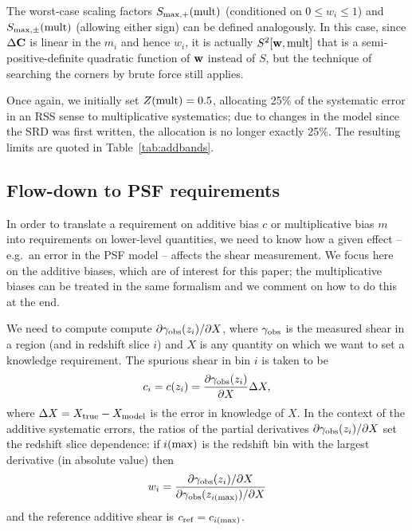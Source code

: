 \documentclass[aps,prd, amsmath,amssymb,superscriptaddress,showkeys,nofootinbib,reprint,preprintnumbers]{revtex4-1}
\begin{document}
\begin{widetext}
The worst-case scaling factors $S_{\rm max,+}({\rm mult})$ (conditioned on $0\le w_i\le 1$) and $S_{\rm max,\pm}({\rm mult})$ (allowing either sign) can be defined analogously. In this case, since $\Delta{\bf C}$ is linear in the $m_i$ and hence $w_i$, it is actually $S^2[{\bf w},{\rm mult}]$ that is a semi-positive-definite quadratic function of ${\bf w}$ instead of $S$, but the technique of searching the corners by brute force still applies.

Once again, we initially set $Z({\rm mult})=0.5$, allocating 25\% of the systematic error in an RSS sense to multiplicative systematics; due to changes in the model since the SRD was first written, the allocation is no longer exactly 25\%. The resulting limits are quoted in Table~\ref{tab:addbands}.

\subsection{Flow-down to PSF requirements}


In order to translate a requirement on additive bias $c$ or multiplicative bias $m$ into requirements on lower-level quantities, we need to know how a given effect -- e.g.\ an error in the PSF model -- affects the shear measurement. We focus here on the additive biases, which are of interest for this paper; the multiplicative biases can be treated in the same formalism and we comment on how to do this at the end.

We need to compute compute $\partial\gamma_{\rm obs}(z_i)/\partial X$, where $\gamma_{\rm obs}$ is the measured shear in a region (and in redshift slice $i$) and $X$ is any quantity on which we want to set a knowledge requirement. The spurious shear in bin $i$ is taken to be
\begin{equation}
c_i = c(z_i) = \frac{\partial\gamma_{\rm obs}(z_i)}{\partial X} \Delta X,
\label{eq:X-shape}
\end{equation}
where $\Delta X = X_{\rm true} - X_{\rm model}$ is the error in
knowledge of $X$. In the context of the additive systematic errors,
the ratios of the partial derivatives $\partial\gamma_{\rm
obs}(z_i)/\partial X$ set the redshift slice dependence: if $i({\rm
max})$ is the redshift bin with the largest derivative (in absolute
value) then
\begin{equation}
w_i = \frac{\partial\gamma_{\rm obs}(z_i)/\partial X}{\partial\gamma_{\rm obs}(z_{i({\rm max})})/\partial X}
\end{equation}
and the reference additive shear is $c_{\rm ref} = c_{i({\rm max})}$.


\end{widetext}
\end{document}
